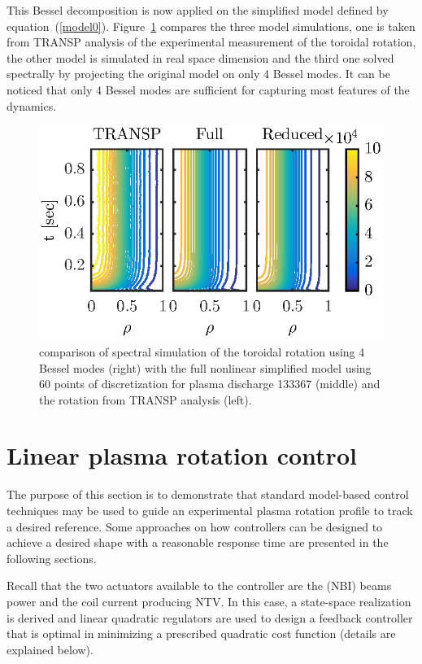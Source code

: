 \documentclass[12pt]{iopart}
\begin{document}
This Bessel decomposition is now applied on the simplified model defined by equation~(\ref{model0}). Figure~\ref{bessel1} compares the three model simulations, one is taken from TRANSP analysis of the experimental measurement of the toroidal rotation, the other model is simulated in real space dimension and the third one solved spectrally by projecting the original model on only 4 Bessel modes. It can be noticed that only 4 Bessel modes are sufficient for capturing most features of the dynamics.
\begin{figure}
\includegraphics[width=\linewidth]{imene_figs/fig11} %
\caption{comparison of spectral simulation of the toroidal rotation using 4 Bessel modes (right) with the full nonlinear simplified model using 60 points of discretization for plasma discharge 133367 (middle) and the rotation from TRANSP analysis (left). }
\label{bessel1}
\end{figure}

\section{Linear plasma rotation control}
 \label{LRPC}
 
 The purpose of this section is to demonstrate that standard model-based control techniques may be used to guide an experimental plasma rotation profile to track a desired reference. Some approaches on how controllers can be designed to achieve a desired shape with a reasonable response time are presented in the following sections.
 
 Recall that the two actuators available to the controller are the (NBI) beams power and the coil current producing NTV.
In this case, a state-space realization is derived and linear quadratic regulators are used to design a feedback controller that is optimal in minimizing a prescribed quadratic cost function (details are explained below).
\end{document}
